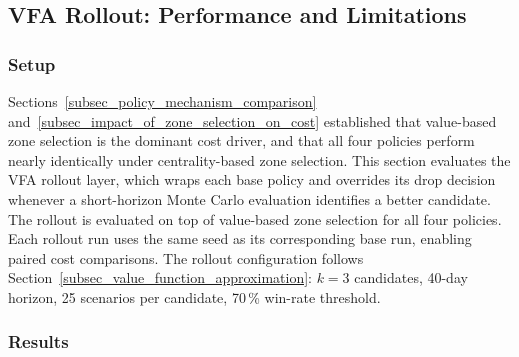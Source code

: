 \documentclass[12pt,oneside]{article}
\begin{document}
\subsection{VFA Rollout: Performance and Limitations}\label{subsec_vfa_rollout_performance_and_limitations}

\subsubsection*{Setup}

Sections~\ref{subsec_policy_mechanism_comparison} and~\ref{subsec_impact_of_zone_selection_on_cost} established that value-based zone selection is the dominant cost driver, and that all four policies perform nearly identically under centrality-based zone selection. This section evaluates the VFA rollout layer, which wraps each base policy and overrides its drop decision whenever a short-horizon Monte Carlo evaluation identifies a better candidate. The rollout is evaluated on top of value-based zone selection for all four policies. Each rollout run uses the same seed as its corresponding base run, enabling paired cost comparisons. The rollout configuration follows Section~\ref{subsec_value_function_approximation}: $k = 3$ candidates, 40-day horizon, 25 scenarios per candidate, 70\,\% win-rate threshold.

\begin{table}[H]
\centering
\caption{Rollout effect per policy. All variants use value-based zone selection (500 runs each). Override rate = mean replan overrides / mean total carryover ($\approx$48).}
\label{tab:rollout}
\end{table}

\subsubsection*{Results}
\end{document}
